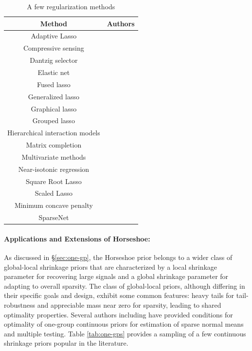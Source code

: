 \documentclass[11pt]{article}
\begin{document}
\begin{table}[ht!]
  \centering
  \caption{A few regularization methods}
  \footnotesize{
    \begin{tabular}{|c|c|}
    \hline
    Method  & Authors  \bigstrut\\
    \hline
    Adaptive Lasso & \citet{zou2006adaptive} \bigstrut[t]\\
    Compressive sensing  & \citet{donoho2006compressed,candes2008restricted} \\
    Dantzig selector  & \citet{candes2007dantzig} \\
    Elastic net & \citet{zou2005regularization} \\
    Fused lasso & \citet{tibshirani2005sparsity} \\
    Generalized lasso & \citet{tibshirani2011solution} \\
    Graphical lasso & \citet{friedman2008sparse} \\
    Grouped lasso & \citet{yuan2006model} \\
    Hierarchical interaction models & \citet{bien2013lasso} \\
    Matrix completion & \citet{candes2010power,mazumder2010spectral} \\
    Multivariate methods & \citet{jolliffe2003modified,witten2009penalized} \\
    Near-isotonic regression & \citet{tibshirani2011nearly} \\
    Square Root Lasso  & \citet{belloni2011square} \\
    Scaled Lasso & \citet{sun2012scaled} \\
    Minimum concave penalty & \citet{zhang2010nearly} \\
    SparseNet & \citet{mazumder2012} \bigstrut[b]\\
    \hline
    \end{tabular}%
    }
  \label{tab:lasso:ext}%
\end{table}%

\paragraph{Applications and Extensions of Horseshoe:}

As discussed in \S \ref{sec:one-gp}, the Horseshoe prior belongs to a wider class of global-local shrinkage priors \citep{polson2010shrink} that are characterized by a local shrinkage parameter for recovering large signals and a global shrinkage parameter for adapting to overall sparsity. The class of global-local priors, although differing in their specific goals and design, exhibit some common features: heavy tails for tail-robustness and appreciable mass near zero for sparsity, leading to shared optimality properties. Several authors including \citet{van2015conditions, ghosh2016asymptotic, ghosh2016testing} have provided conditions for optimality of one-group continuous priors for estimation of sparse normal means and multiple testing. Table \ref{tab:one-gps} provides a sampling of a few continuous shrinkage priors popular in the literature. 
\end{document}
